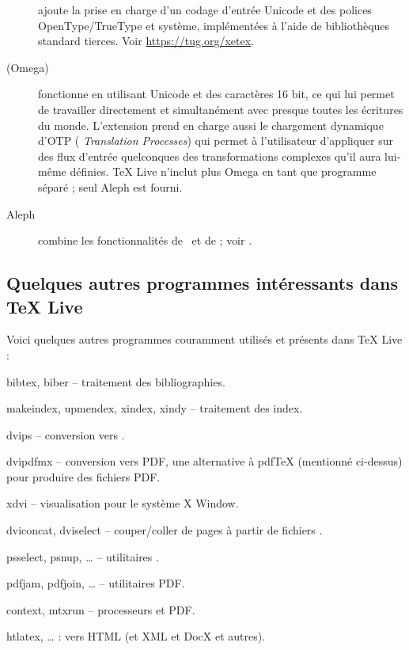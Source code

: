 \documentclass[german, english, french, 12pt]{article}
\renewcommand{\TL}{\TeX{} Live\xspace}%
\begin{document}
\begin{description}
\item[\XeTeX] ajoute la prise en charge d'un codage d'entrée Unicode et des
  polices OpenType/TrueType et système, implémentées à l'aide de bibliothèques
  standard tierces. Voir \url{https://tug.org/xetex}.

\item[\OMEGA{} (Omega)] fonctionne en utilisant Unicode et des caractères 16
  bit, ce qui lui permet de travailler directement et simultanément avec presque
  toutes les écritures du monde.  L'extension prend en charge aussi le
  chargement dynamique d'OTP (\OMEGA{} \emph{Translation Processes}) qui permet
  à l'utilisateur d'appliquer sur des flux d'entrée quelconques des
  transformations complexes qu'il aura lui-même définies. \TL n'inclut plus
  Omega en tant que programme séparé ; seul Aleph est fourni.

\item[Aleph] combine les fonctionnalités de \OMEGA\ et de \eTeX ; voir
  .

\end{description}

\subsection{Quelques autres programmes intéressants dans \protect\TL}

Voici quelques autres programmes couramment utilisés et présents dans \TL{} :

\begin{cmddescription}

\item[bibtex, biber] -- traitement des bibliographies.

\item[makeindex, upmendex, xindex, xindy] -- traitement des index.

\item[dvips] -- conversion \dvi{} vers \PS{}.

\item[dvipdfmx] -- conversion \dvi{} vers PDF, une alternative à pdf\TeX{}
  (mentionné ci-dessus) pour produire des fichiers PDF.

\item[xdvi] -- visualisation \dvi{} pour le système X Window.

\item[dviconcat, dviselect] -- couper/coller de pages à partir de fichiers
  \dvi{}.

\item[psselect, psnup, \ldots] -- utilitaires \PS{}.

\item[pdfjam, pdfjoin, \ldots] -- utilitaires PDF.

\item[context, mtxrun] -- processeurs \ConTeXt{} et PDF.

\item [htlatex, \ldots]  : \AllTeX{} vers HTML (et XML et DocX
  et autres).

\end{cmddescription}
\end{document}
